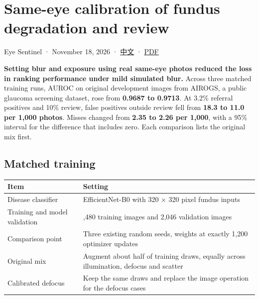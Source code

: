 \documentclass[
  10pt,
]{article}
\author{}
\date{}
\newcounter{none} %
\begin{document}
\section{Same-eye calibration of fundus degradation and
review}\label{same-eye-calibration-of-fundus-degradation-and-review}

Eye Sentinel · November 18, 2026 · \href{calibrated-defocus.zh.md}{中文}
· \href{calibrated-defocus.en.pdf}{PDF}

\textbf{Setting blur and exposure using real same-eye photos reduced the
loss in ranking performance under mild simulated blur.} Across three
matched training runs, AUROC on original development images from AIROGS,
a public glaucoma screening dataset, rose from \textbf{0.9687 to
0.9713}. At 3.2\% referral positives and 10\% review, false positives
outside review fell from \textbf{18.3 to 11.0 per 1,000 photos}. Misses
changed from \textbf{2.35 to 2.26 per 1,000}, with a 95\% interval for
the difference that includes zero. Each comparison lists the original
mix first.

\subsection{Matched training}\label{matched-training}

{\def\LTcaptype{none} %
\begin{longtable}[]{@{}
  >{\raggedright\arraybackslash}p{}
  >{\raggedright\arraybackslash}p{}@{}}
\toprule\noalign{}
\begin{minipage}[b]{\linewidth}\raggedright
Item
\end{minipage} & \begin{minipage}[b]{\linewidth}\raggedright
Setting
\end{minipage} \\
\midrule\noalign{}
\endhead
\bottomrule\noalign{}
\endlastfoot
Disease classifier & EfficientNet-B0 with 320 × 320 pixel fundus
inputs \\
Training and model validation & 15,480 training images and 2,046
validation images \\
Comparison point & Three existing random seeds, weights at exactly 1,200
optimizer updates \\
Original mix & Augment about half of training draws, equally across
illumination, defocus and scatter \\
Calibrated defocus & Keep the same draws and replace the image operation
for the defocus cases \\
\end{longtable}
}
\end{document}
